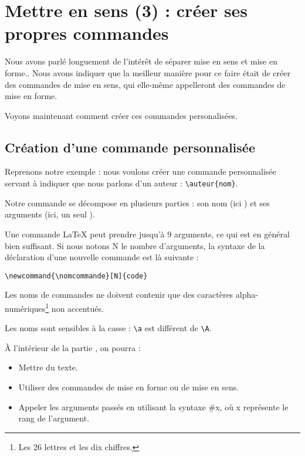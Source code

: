 \chapter{Mettre en sens (3) : créer ses propres commandes}

\begin{prealable}
Nous avons parlé longuement de l'intérêt de séparer mise en sens et mise en forme..
Nous avons indiquer que la meilleur manière pour ce faire était de créer des commandes de mise en sens, qui elle-même appelleront des commandes de mise en forme.

Voyons maintenant comment créer ces commandes personalisées.
\end{prealable}

\section{Création d'une commande personnalisée}

Reprenons notre exemple : nous voulons créer une commande personnalisée servant à indiquer que nous parlons d'un auteur : \verb|\auteur{nom}|.

Notre commande se décompose en plusieurs parties : son nom (ici ) et ses arguments (ici, un seul ).

Une commande LaTeX peut prendre jusqu'à 9 arguments, ce qui est en général bien suffisant. Si nous notons N le nombre d'arguments, la syntaxe de la déclaration d'une nouvelle commande est là suivante :

\begin{verbatim}
\newcommand{\nomcommande}[N]{code}
\end{verbatim}

\begin{attention}
	Les noms de commandes ne doivent contenir que des caractères alpha-numériques\footnote{Les 26 lettres et les dix chiffres.} non accentués. 
	
	Les noms sont sensibles à la casse : \verb|\a| est différent de \verb|\A|.
\end{attention}
À l'intérieur de la partie , on pourra  :
\begin{itemize}
	\item Mettre du texte.
	\item Utiliser des commandes de mise en forme ou de mise en sens.
	\item Appeler les arguments passés en utilisant la syntaxe \#x, où x représente le rang de l'argument.
\end{itemize}

